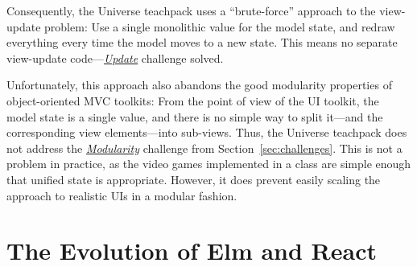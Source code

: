 \documentclass[sigplan,screen]{acmart}
\begin{document}
Consequently, the Universe teachpack uses a ``brute-force'' approach
to the view-update problem: Use a single monolithic value for the model
state, and redraw everything every time the model moves to a new
state.  This means no separate view-update code---\hyperlink{challenge:update}{\textit{Update}} challenge
solved.

Unfortunately, this approach also abandons the good modularity
properties of object-oriented MVC toolkits: From the point of view of
the UI toolkit, the model state is a single value, and there is no
simple way to split it---and the corresponding view elements---into
sub-views.  Thus, the Universe
teachpack does not address the \hyperlink{challenge:modularity}{\textit{Modularity}} challenge from
Section~\ref{sec:challenges}.  This is not a
problem in practice, as the video games implemented in
a class are simple enough that unified state is appropriate.  However,
it does prevent easily scaling the approach to realistic UIs in a
modular fashion.

\section{The Evolution of Elm and React}
\label{sec:elm-react}
\end{document}
